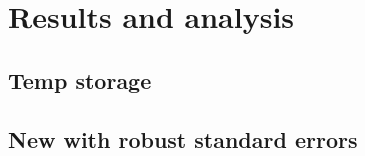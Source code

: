 
\chapter{Results and analysis}

\cleardoublepage

\section{Temp storage}


\section{New with robust standard errors}


